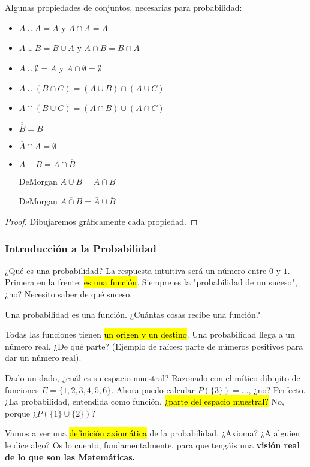 \begin{prop}
Algunas propiedades de conjuntos, necesarias para probabilidad:

	\begin{itemize}
		\item $A\cup A=A$ y $A\cap A = A$
		\item $A\cup B=B\cup A$ y $A\cap B = B\cap A$
		\item $A\cup \emptyset=A$ y $A\cap \emptyset = \emptyset$
		\item $A\cup (B\cap C) = (A\cup B)\cap (A\cup C)$
		\item $A\cap (B\cup C) = (A\cap B)\cup (A\cap C)$
		\item $\overline{\overline{B}} = B$
		\item $\overline{A}\cap A = \emptyset$
		\item $A- B = A\cap \overline{B}$
		\item[DeMorgan] $\overline{A\cup B} = \overline{A}\cap\overline{B}$
		\item[DeMorgan] $\overline{A\cap B} = \overline{A}\cup\overline{B}$
	\end{itemize}
\end{prop}
\begin{proof}
Dibujaremos gráficamente cada propiedad.
\end{proof}







\subsubsection{Introducción a la Probabilidad}

{¿Qu\'e es una probabilidad? La respuesta intuitiva será un número entre $0$ y $1$. Primera en la frente: \hl{es una función}. Siempre es la "probabilidad de un suceso", ¿no? Necesito saber de qué suceso. 

Una probabilidad es una función. ¿Cuántas cosas recibe una función?

Todas las funciones tienen \hl{un origen y un destino}. Una probabilidad llega a un número real. ¿De qué parte? (Ejemplo de raíces: parte de números positivos para dar un número real).

Dado un dado, ¿cuál es su espacio muestral? Razonado con el mítico dibujito de funciones 
$E=\{1,2,3,4,5,6\}$. Ahora puedo calcular $P(\{3\}) = ...$, ¿no? Perfecto. ¿La probabilidad, entendida como función, \hl{¿parte del espacio muestral?} No, porque ¿$P(\{1\}\cup\{2\})$? 

Vamos a ver una \hl{definición axiomática} de la probabilidad. ¿Axioma? ¿A alguien le dice algo? Os lo cuento, fundamentalmente, para que tengáis una \textbf{visi\'on real de lo que son las Matemáticas.}}

